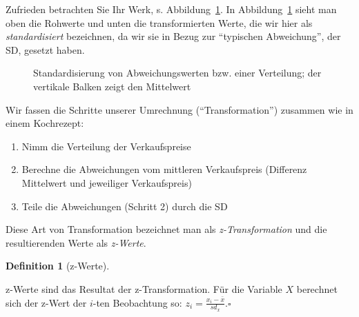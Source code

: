 \documentclass[
  letterpaper,
]{scrbook}
\providecommand{\tightlist}{%
  \setlength{\itemsep}{0pt}\setlength{\parskip}{0pt}}\usepackage{longtable,booktabs,array}
\theoremstyle{definition}
\theoremstyle{definition}
\newtheorem{definition}{Definition}[chapter]
\theoremstyle{definition}
\theoremstyle{remark}
\begin{document}
Zufrieden betrachten Sie Ihr Werk, s. Abbildung~\ref{fig-z-transf}. In
Abbildung~\ref{fig-z-transf} sieht man oben die Rohwerte und unten die
transformierten Werte, die wir hier als \emph{standardisiert}
bezeichnen, da wir sie in Bezug zur ``typischen Abweichung'', der SD,
gesetzt haben.

\begin{figure}


\caption{\label{fig-z-transf}Standardisierung von Abweichungswerten bzw.
einer Verteilung; der vertikale Balken zeigt den Mittelwert}

\end{figure}%

Wir fassen die Schritte unserer Umrechnung (``Transformation'') zusammen
wie in einem Kochrezept:

\begin{enumerate}
\def\labelenumi{\arabic{enumi}.}
\tightlist
\item
  Nimm die Verteilung der Verkaufspreise
\item
  Berechne die Abweichungen vom mittleren Verkaufspreis (Differenz
  Mittelwert und jeweiliger Verkaufspreis)
\item
  Teile die Abweichungen (Schritt 2) durch die SD
\end{enumerate}

Diese Art von Transformation bezeichnet man als \emph{z-Transformation}
und die resultierenden Werte als \emph{z-Werte}.

\begin{definition}[z-Werte]\protect\hypertarget{def-z-werte}{}\label{def-z-werte}

z-Werte sind das Resultat der z-Transformation. Für die Variable \(X\)
berechnet sich der z-Wert der \(i\)-ten Beobachtung so:
\(z_i = \frac{x_i - \bar{x}}{sd_x}.\square\)

\end{definition}
\end{document}
